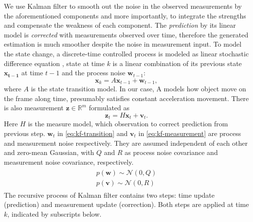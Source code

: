 We use Kalman filter to smooth out the noise in the observed measurements by the aforementioned components and more importantly, to integrate the strengths and compensate the weakness of each component. The \emph{prediction} by its linear model is \emph{corrected} with measurements observed over time, therefore the generated estimation is much smoother despite the noise in measurement input. 
To model the state change, a discrete-time controlled process is modeled as linear stochastic difference equation \cite{Welch:1995:IKF:897831}, state at time $k$ is a linear combination of its previous state $\mathbf{x_{t-1}}$ at time $t-1$
and the process noise $\mathbf{w}_{t-1}$:
\begin{equation}
  \mathbf{x}_k = A\mathbf{x}_{t-1} + \mathbf{w}_{t-1}, \label{eq:kf-transition}
\end{equation}
where $A$ is the state transition model.
In our case, A models how object move on the frame along time, presumably satisfies constant acceleration movement.
There is also measurement $\mathbf{z}\in \mathbb{R}^{m}$ formulated as
\begin{equation}
\mathbf{z}_t = H\mathbf{x}_t+\mathbf{v}_t.
\label{eq:kf-measurement}
\end{equation}
Here $H$ is the measure model, which observation to correct prediction from previous step. $\mathbf{w}_t$ in \ref{eq:kf-transition} and $\mathbf{v}_t$ in \ref{eq:kf-measurement} are process and measurement noise respectively. They are assumed independent of each other and zero-mean Gaussian, with $Q$ and $R$ as process noise covariance and measurement noise covariance, respectively.
\begin{align}
\begin{split}
p(\mathbf{w})\sim \mathcal{N}(0, Q)\\
p(\mathbf{v})\sim \mathcal{N}(0, R)
\end{split}
\end{align}
The recursive process of Kalman filter contains two steps: time update (prediction) and measurement update (correction). Both steps are applied at time $k$, indicated by subscripts below.
